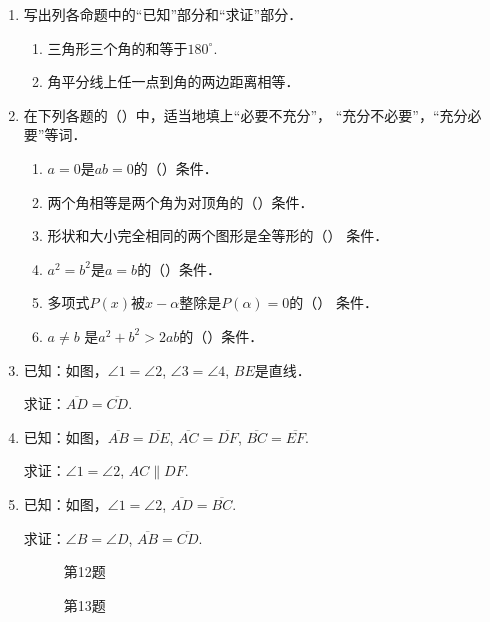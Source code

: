 \begin{enumerate}
\item 写出列各命题中的“已知”部分和“求证”部分．
\begin{enumerate}
	\item 三角形三个角的和等于$180^{\circ}$.
	\item 角平分线上任一点到角的两边距离相等．
\end{enumerate}

\item 在下列各题的（\qquad）中，适当地填上“必要不充分”，
“充分不必要”，“充分必要”等词．
\begin{enumerate}
	\item $a=0$是$ab=0$的（\qquad）条件．
	\item 两个角相等是两个角为对顶角的（\qquad）条件．
	\item 形状和大小完全相同的两个图形是全等形的（\qquad）
	条件．
	\item $a^2=b^2$是$a=b$的（\qquad）条件．
	\item 多项式$P(x)$被$x-\alpha$整除是$P(\alpha)=0$的（\qquad）
	条件．
	\item $a\ne b$ 是$a^2+b^2>2ab$的（\qquad）条件．
\end{enumerate}

\item 已知：如图，$\angle 1=\angle 2$, $\angle 3=\angle 4$, $BE$是直线．

求证：$\overline{AD}=\overline{CD}$.

\item 已知：如图，$\overline{AB}=\overline{DE}$, $\overline{AC}=\overline{DF}$, $\overline{BC}=\overline{EF}$.

求证：$\angle 1=\angle 2$, $AC\parallel DF$.
\item 已知：如图，$\angle 1=\angle 2$, $\overline{AD}=\overline{BC}$.

求证：$\angle B=\angle D$, $\overline{AB}=\overline{CD}$.

\begin{figure}[htp]\centering
    \begin{minipage}[t]{0.48\textwidth}
    \centering
{}
	\caption*{第12题}
    \end{minipage}
    \begin{minipage}[t]{0.48\textwidth}
    \centering
	\caption*{第13题}
    \end{minipage}
    \end{figure}


\end{enumerate}
